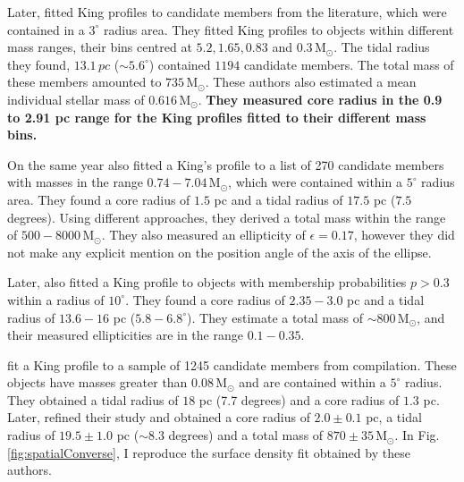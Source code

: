 \sloppy
Later, \citet{Pinfield1998} fitted King profiles \citep{King1962} to candidate members from the literature, which were contained in a $3^{\circ}$ radius area. They fitted King profiles to objects within different mass ranges, their bins centred at $5.2,1.65,0.83$ and $0.3 \,\mathrm{M_{\odot}}$. The tidal radius they found, $13.1\,pc$ ($\sim 5.6^{\circ}$) contained $1194$ candidate members. The total mass of these members amounted to $735\,\mathrm{M_{\odot}}$. These authors also estimated a mean individual stellar mass of $0.616\,\mathrm{M_{\odot}}$. \textbf{They measured core radius in the 0.9 to 2.91 pc range for the King profiles fitted to their different mass bins.}

On the same year \citet{Raboud1998} also fitted a King's profile \citep{King1962} to a list of 270 candidate members with masses in the range $0.74-7.04\,\mathrm{M_{\odot}}$, which were contained within a $5^{\circ}$ radius area. They found a core radius of $1.5$ pc and a tidal radius of $17.5$ pc ($7.5$ degrees). Using different approaches, they derived a total mass within the range of $500 -8000 \,\mathrm{M_{\odot}}$. They also measured an ellipticity of $\epsilon=0.17$, however they did not make any explicit mention on the position angle of the axis of the ellipse.

Later, \citet{Adams2001} also fitted a King profile to objects with membership probabilities $p>0.3$ within a radius of $10^{\circ}$. They found a core radius of $2.35-3.0$ pc and a tidal radius of $13.6-16$ pc ($5.8 - 6.8^{\circ}$). They estimate a total mass of $\sim 800\,\mathrm{M_{\odot}}$, and their measured ellipticities are in the range $0.1-0.35$. 

\citet{Converse2008} fit a King profile to a sample of 1245 candidate members from \citet{Stauffer2007} compilation. These objects have masses greater than $0.08\,\mathrm{M_{\odot}}$ and are contained within a $5^{\circ}$ radius. They obtained a tidal radius of $18$ pc (7.7 degrees) and a core radius of  $1.3$ pc. Later, \citet{Converse2010} refined their study and obtained a core radius of $2.0\pm0.1$ pc, a tidal radius of $19.5 \pm 1.0 $ pc ($\sim 8.3$ degrees) and a total mass of $870\pm35\,\mathrm{M_{\odot}}$. In Fig. \ref{fig:spatialConverse}, I reproduce the surface density fit obtained by these authors.

